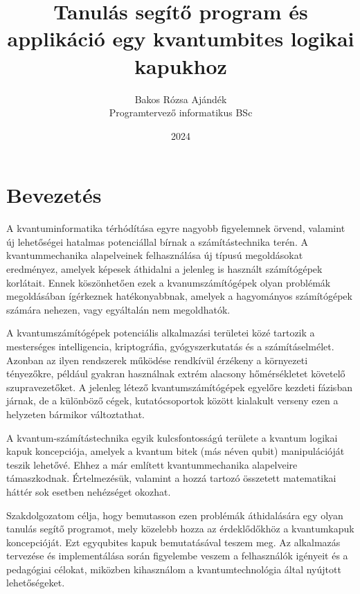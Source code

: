 \documentclass[
]{thesis-ekf}
\theoremstyle{definition}
\theoremstyle{remark}
\begin{document}
\title{Tanulás segítő program és applikáció egy kvantumbites logikai kapukhoz}
\author{Bakos Rózsa Ajándék\\Programtervező informatikus BSc}
\date{2024}
\maketitle
\tableofcontents

\chapter*{Bevezetés}
A kvantuminformatika térhódítása egyre nagyobb figyelemnek örvend, valamint új lehetőségei hatalmas potenciállal bírnak a számítástechnika terén. A kvantummechanika alapelveinek felhasználása új típusú megoldásokat eredményez, amelyek képesek áthidalni a jelenleg is használt számítógépek korlátait. Ennek köszönhetően ezek a kvanumszámítógépek olyan problémák megoldásában ígérkeznek hatékonyabbnak, amelyek a hagyományos számítógépek számára nehezen, vagy egyáltalán nem megoldhatók.

A kvantumszámítógépek potenciális alkalmazási területei közé tartozik a mesterséges intelligencia, kriptográfia, gyógyszerkutatás és a számításelmélet. Azonban az ilyen rendszerek működése rendkívül érzékeny a környezeti tényezőkre, például gyakran használnak extrém alacsony hőmérsékletet követelő szupravezetőket. A jelenleg létező kvantumszámítógépek egyelőre kezdeti fázisban járnak, de a különböző cégek, kutatócsoportok között kialakult verseny ezen a helyzeten bármikor változtathat.

A kvantum-számítástechnika egyik kulcsfontosságú területe a kvantum logikai kapuk koncepciója, amelyek a kvantum bitek (más néven qubit) manipulációját teszik lehetővé. Ehhez a már említett kvantummechanika alapelveire támaszkodnak. Értelmezésük, valamint a hozzá tartozó összetett matematikai háttér sok esetben nehézséget okozhat.

Szakdolgozatom célja, hogy bemutasson ezen problémák áthidalására egy olyan tanulás segítő programot, mely közelebb hozza az érdeklődőkhöz a kvantumkapuk koncepcióját. Ezt egyqubites kapuk bemutatásával teszem meg. Az alkalmazás tervezése és implementálása során figyelembe veszem a felhasználók igényeit és a pedagógiai célokat, miközben kihasználom a kvantumtechnológia által nyújtott lehetőségeket.
\end{document}
